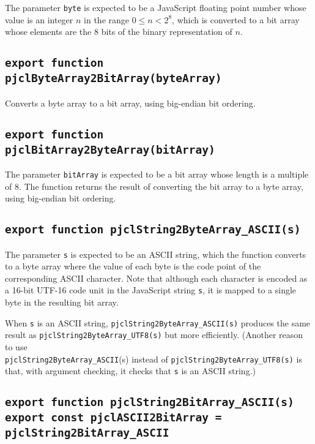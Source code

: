 \documentclass[12pt]{article}
\begin{document}
The parameter {\tt byte} is expected to be a JavaScript floating point
number whose value is an integer $n$ in the range $0\leq n < 2^8$,
which is converted to a bit array whose elements are the 8 bits of the
binary representation of $n$.

\subsection{\tt export function pjclByteArray2BitArray(byteArray)}

Converts a byte array to a bit array, using big-endian bit ordering. 

\subsection{\tt export function pjclBitArray2ByteArray(bitArray)}

The parameter {\tt bitArray} is expected to be a bit array whose length
is a multiple of 8.  The function returns the result of converting the bit array to
a byte array, using big-endian bit ordering. 

\subsection{\tt export function pjclString2ByteArray\_ASCII(s)}

The parameter {\tt s} is expected to be an ASCII string, which the
function converts to a byte array where the value of each byte is the 
code point of the corresponding ASCII character.  Note that although 
each character is encoded as a 16-bit UTF-16 code unit in the JavaScript string {\tt s}, 
it is mapped to a single byte in the resulting bit array.

When {\tt s} is an ASCII string, {\tt pjclString2ByteArray\_ASCII(s)}
produces the same result as {\tt pjclString2ByteArray\_UTF8(s)}
but more efficiently.  (Another reason to use\\
{\tt pjclString2ByteArray\_ASCII}(s) instead of {\tt pjclString2ByteArray\_UTF8(s)} 
is that, with argument checking, it checks that {\tt s} is an ASCII string.)

\subsection{\tt export function pjclString2BitArray\_ASCII(s)\\export const pjclASCII2BitArray = pjclString2BitArray\_ASCII}
\end{document}
